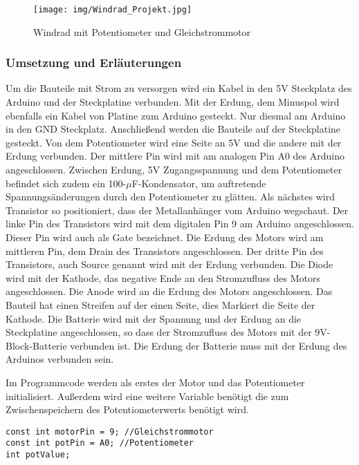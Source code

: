 \begin{figure}[h]
\begin{center}
\texttt{[image: img/Windrad\_Projekt.jpg]}
\caption{Windrad mit Potentiometer und Gleichstrommotor}
\label{Windrad_project}
\end{center}
\end{figure}
\subsubsection{Umsetzung und Erläuterungen}
Um die Bauteile mit Strom zu versorgen wird ein Kabel in den 5V Steckplatz des Arduino und der Steckplatine verbunden. Mit der Erdung, dem Minuspol wird ebenfalls ein Kabel von Platine zum Arduino gesteckt. Nur diesmal am Arduino in den GND Steckplatz. Anschließend werden die Bauteile auf der Steckplatine gesteckt. Von dem Potentiometer wird eine Seite an 5V und die andere mit der Erdung verbunden. Der mittlere Pin wird mit am analogen Pin A0 des Arduino angeschlossen. Zwischen Erdung, 5V Zugangsspannung und dem Potentiometer befindet sich zudem ein 100-$\mu$F-Kondensator, um auftretende Spannungsänderungen durch den Potentiometer zu glätten. Als nächstes wird Transistor so positioniert, dass der Metallanhänger vom Arduino wegschaut. Der linke Pin des Transistors wird mit dem digitalen Pin 9 am Arduino angeschlossen. Dieser Pin wird auch als Gate bezeichnet. Die Erdung des Motors wird am mittleren Pin, dem Drain des Transistors angeschlossen. Der dritte Pin des Transistors, auch Source genannt wird mit der Erdung verbunden. Die Diode wird mit der Kathode, das negative Ende an den Stromzufluss des Motors angeschlossen. Die Anode wird an die Erdung des Motors angeschlossen. Das Bauteil hat einen Streifen auf der einen Seite, dies Markiert die Seite der Kathode. Die Batterie wird mit der Spannung und der Erdung an die Steckplatine angeschlossen, so dass der Stromzufluss des Motors mit der 9V-Block-Batterie verbunden ist. Die Erdung der Batterie muss mit der Erdung des Arduinos verbunden sein.

Im Programmcode werden als erstes der Motor und das Potentiometer initialisiert. Außerdem wird eine weitere Variable benötigt die zum Zwischenspeichern des Potentiometerwerts benötigt wird.
\begin{lstlisting}[language=Arduino]
const int motorPin = 9; //Gleichstrommotor
const int potPin = A0; //Potentiometer
int potValue;
\end{lstlisting}

